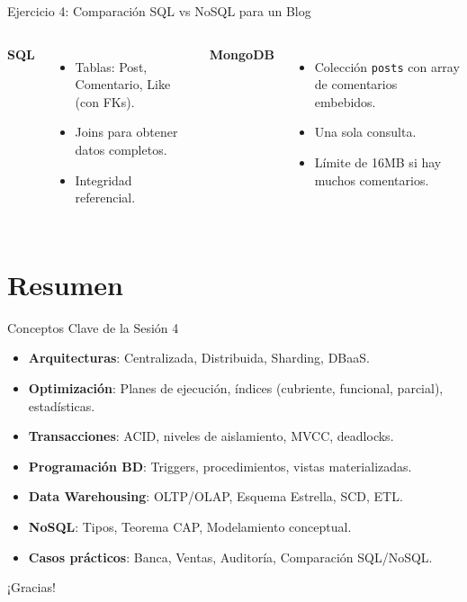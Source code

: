 \documentclass[aspectratio=169, 10pt, xcolor=table]{beamer}
\begin{document}
\begin{frame}{Ejercicio 4: Comparación SQL vs NoSQL para un Blog}
    \begin{columns}[t]
        \textbf{SQL}
        \begin{itemize}
            \item Tablas: Post, Comentario, Like (con FKs).
            \item Joins para obtener datos completos.
            \item Integridad referencial.
        \end{itemize}
        \textbf{MongoDB}
        \begin{itemize}
            \item Colección \texttt{posts} con array de comentarios embebidos.
            \item Una sola consulta.
            \item Límite de 16MB si hay muchos comentarios.
        \end{itemize}
    \end{columns}
\end{frame}

\section{Resumen}

\begin{frame}{Conceptos Clave de la Sesión 4}
    \begin{itemize}
        \item \textbf{Arquitecturas}: Centralizada, Distribuida, Sharding, DBaaS.
        \item \textbf{Optimización}: Planes de ejecución, índices (cubriente, funcional, parcial), estadísticas.
        \item \textbf{Transacciones}: ACID, niveles de aislamiento, MVCC, deadlocks.
        \item \textbf{Programación BD}: Triggers, procedimientos, vistas materializadas.
        \item \textbf{Data Warehousing}: OLTP/OLAP, Esquema Estrella, SCD, ETL.
        \item \textbf{NoSQL}: Tipos, Teorema CAP, Modelamiento conceptual.
        \item \textbf{Casos prácticos}: Banca, Ventas, Auditoría, Comparación SQL/NoSQL.
    \end{itemize}
\end{frame}

\begin{frame}
    \centering

    
    \vspace{1cm}
    \large ¡Gracias!
\end{frame}
\end{document}
